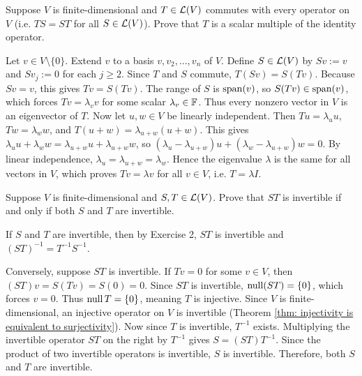 \begin{xrcs}
  Suppose $V$ is finite-dimensional and $T \in \mathcal{L}(V)$ commutes with every operator on $V$ (i.e. $TS = ST$ for all $S \in \mathcal{L}(V)$). Prove that $T$ is a scalar multiple of the identity operator.
\begin{xprf}
  Let $v \in V \setminus \{0\}$. Extend $v$ to a basis $v, v_2, \dots, v_n$ of $V$.
  Define $S \in \mathcal{L}(V)$ by $Sv := v$ and $S v_j := 0$ for each $j \ge 2$.
  Since $T$ and $S$ commute, $T(Sv) = S(Tv)$.
  Because $Sv = v$, this gives $Tv = S(Tv)$.
  The range of $S$ is $\operatorname{span} (v)$, so $S(Tv) \in \operatorname{span} (v)$, which forces $Tv = \lambda_v v$ for some scalar $\lambda_v \in \mathbb{F}$.
  Thus every nonzero vector in $V$ is an eigenvector of $T$.
  Now let $u, w \in V$ be linearly independent. Then $Tu = \lambda_u u$, $Tw = \lambda_w w$, and $T(u+w) = \lambda_{u+w}(u+w)$.
  This gives $\lambda_u u + \lambda_w w = \lambda_{u+w} u + \lambda_{u+w} w$, so $(\lambda_u - \lambda_{u+w})u + (\lambda_w - \lambda_{u+w})w = 0$.
  By linear independence, $\lambda_u = \lambda_{u+w} = \lambda_w$.
  Hence the eigenvalue $\lambda$ is the same for all vectors in $V$, which proves $Tv = \lambda v$ for all $v \in V$, i.e. $T = \lambda I$.
\end{xprf}
\end{xrcs}

\begin{xrcs}
  Suppose $V$ is finite-dimensional and $S, T \in \mathcal{L}(V)$. Prove that $ST$ is invertible if and only if both $S$ and $T$ are invertible.

\begin{xprf}
  \Leftarrowdirection If $S$ and $T$ are invertible, then by Exercise 2, $ST$ is invertible and $(ST)^{-1} = T^{-1} S^{-1}$.

  \Rightarrowdirection Conversely, suppose $ST$ is invertible.
  If $Tv = 0$ for some $v \in V$, then $(ST)v = S(Tv) = S(0) = 0$.
  Since $ST$ is invertible, $\operatorname{null}(ST) = \{0\}$, which forces $v = 0$.
  Thus $\operatorname{null} T = \{0\}$, meaning $T$ is injective.
  Since $V$ is finite-dimensional, an injective operator on $V$ is invertible (Theorem \ref{thm: injectivity is equivalent to surjectivity}).
  Now since $T$ is invertible, $T^{-1}$ exists.
  Multiplying the invertible operator $ST$ on the right by $T^{-1}$ gives $S = (ST) T^{-1}$.
  Since the product of two invertible operators is invertible, $S$ is invertible.
  Therefore, both $S$ and $T$ are invertible.
\end{xprf}
\end{xrcs}
